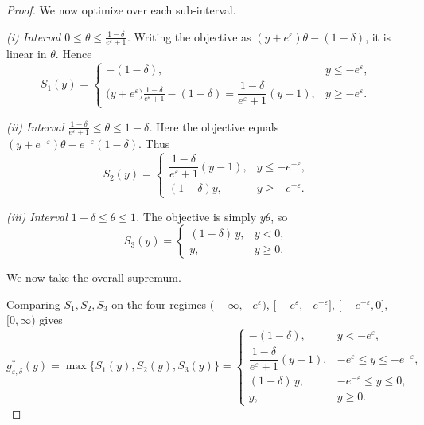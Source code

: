 \documentclass[accepted]{article}
\theoremstyle{plain} %
\theoremstyle{definition}
\theoremstyle{remark}
\begin{document}
\begin{proof}
\vspace{4pt}
\noindent
We now optimize over each sub-interval.

\emph{(i) Interval \(0\le\theta\le  \frac{1-\delta}{e^{\varepsilon}+1}\).}  
Writing the objective as \((y+e^{\varepsilon})\theta-(1-\delta)\), it is linear in \(\theta\).
Hence  
\[
S_1(y)=
\begin{cases}
-(1-\delta), & y\le -e^{\varepsilon},\\[4pt]
\bigl(y+e^{\varepsilon}\bigr) \frac{1-\delta}{e^{\varepsilon}+1}-(1-\delta)
      =\dfrac{1-\delta}{e^{\varepsilon}+1}(y-1),
      & y\ge -e^{\varepsilon}.
\end{cases}
\]

\emph{(ii) Interval \(\frac{1-\delta}{e^{\varepsilon}+1}\le\theta\le 1-\delta\).}  
Here the objective equals \((y+e^{-\varepsilon})\theta-e^{-\varepsilon}(1-\delta)\).
Thus  
\[
S_2(y)=
\begin{cases}
\dfrac{1-\delta}{e^{\varepsilon}+1}(y-1), & y\le -e^{-\varepsilon},\\[6pt]
(1-\delta)y, & y\ge -e^{-\varepsilon}.
\end{cases}
\]

\emph{(iii) Interval \(1 - \delta\le\theta\le 1\).}  
The objective is simply \(y\theta\), so  
\[
S_3(y)=
\begin{cases}
(1-\delta)\,y, & y< 0,\\[4pt]
y, & y\ge 0.
\end{cases}
\]

We now take the overall supremum.

Comparing \(S_1,S_2,S_3\) on the four regimes  
\(\bigl(-\infty,-e^{\varepsilon}\bigr)\),
\(\bigl[-e^{\varepsilon},-e^{-\varepsilon}\bigr]\),
\(\bigl[-e^{-\varepsilon},0\bigr]\),
\([0,\infty)\)
gives
\[
g_{\varepsilon,\delta}^{*}(y)
   =\max\{S_1(y),S_2(y),S_3(y)\}
   =
\begin{cases}
-(1-\delta),
   & y< -e^{\varepsilon},\\[6pt]
\dfrac{1-\delta}{e^{\varepsilon}+1}(y-1),
   & -e^{\varepsilon}\le y\le -e^{-\varepsilon},\\[10pt]
(1-\delta)\,y,
   & -e^{-\varepsilon}\le y\le 0,\\[6pt]
y,
   & y\ge 0.
\end{cases}
\]



\end{proof}
\end{document}
